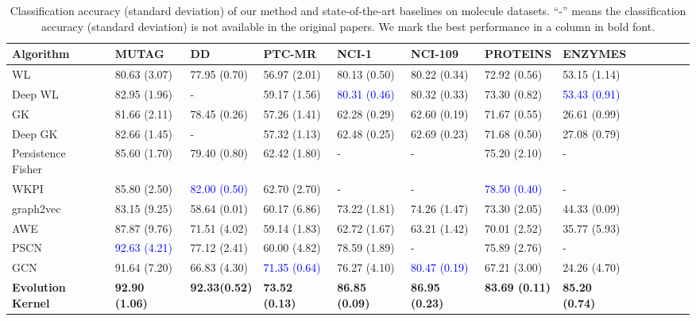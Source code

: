\documentclass[10pt,journal,compsoc]{IEEEtran}
\begin{document}
\begin{table}
\centering
\caption{Classiﬁcation accuracy (standard deviation) of our method and state-of-the-art baselines on molecule datasets. “-” means the classiﬁcation accuracy (standard deviation) is not available in the original papers. We mark the best performance in a column in bold font.
}
{
\begin{tabular}{lllllllllllll}
\toprule
\textbf{Algorithm}                          & \textbf{MUTAG} & \textbf{DD} & \textbf{PTC-MR} & \textbf{NCI-1} & \textbf{NCI-109} & \textbf{PROTEINS} & \textbf{ENZYMES} \\
\midrule
WL~\cite{weisfeiler-lehman-graph-kernels}   & 80.63 (3.07)& 77.95 (0.70)& 56.97 (2.01)& 80.13 (0.50)& 80.22 (0.34)& 72.92 (0.56)& 53.15 (1.14)\\
Deep WL~\cite{deep-graph-kernel}            & 82.95 (1.96)& -           & 59.17 (1.56)& \textcolor{blue}{80.31 (0.46)}& 80.32 (0.33)& 73.30 (0.82)& \textcolor{blue}{53.43 (0.91)}\\
GK~\cite{graphlet-kernel}                   & 81.66 (2.11)& 78.45 (0.26)& 57.26 (1.41)& 62.28 (0.29)& 62.60 (0.19)& 71.67 (0.55)& 26.61 (0.99)\\
Deep GK~\cite{deep-graph-kernel}            & 82.66 (1.45)& -           & 57.32 (1.13)& 62.48 (0.25)& 62.69 (0.23)& 71.68 (0.50)& 27.08 (0.79)\\
Persistence Fisher~\cite{Persistence-Fisher}& 85.60 (1.70)& 79.40 (0.80)& 62.42 (1.80)&-            &-            & 75.20 (2.10)& -\\
WKPI~\cite{WKPI}                            & 85.80 (2.50)& \textcolor{blue}{82.00 (0.50)}& 62.70 (2.70)&-            &-            & \textcolor{blue}{78.50 (0.40)}& -\\
graph2vec~\cite{node2vec}                   & 83.15 (9.25)& 58.64 (0.01)& 60.17 (6.86)& 73.22 (1.81)& 74.26 (1.47)& 73.30 (2.05)& 44.33 (0.09)\\
AWE~\cite{AWE}                              & 87.87 (9.76)& 71.51 (4.02)& 59.14 (1.83)& 62.72 (1.67)& 63.21 (1.42)& 70.01 (2.52)& 35.77 (5.93)\\
PSCN~\cite{PSCN}                            & \textcolor{blue}{92.63 (4.21)}& 77.12 (2.41)& 60.00 (4.82)& 78.59 (1.89)& -           & 75.89 (2.76)& -\\
GCN~\cite{GCN}                              & 91.64 (7.20)& 66.83 (4.30)& \textcolor{blue}{71.35 (0.64)}& 76.27 (4.10)& \textcolor{blue}{80.47 (0.19)}& 67.21 (3.00)& 24.26 (4.70)\\
\midrule
\textbf{Evolution Kernel}                   & \textbf{92.90 (1.06)}& \textbf{92.33(0.52)}& \textbf{73.52 (0.13)}& \textbf{86.85 (0.09)}& \textbf{86.95 (0.23)}& \textbf{83.69 (0.11)}& \textbf{85.20 (0.74)}\\
\bottomrule
\end{tabular}}
\label{Table-results-molecule}
\end{table}
\end{document}
